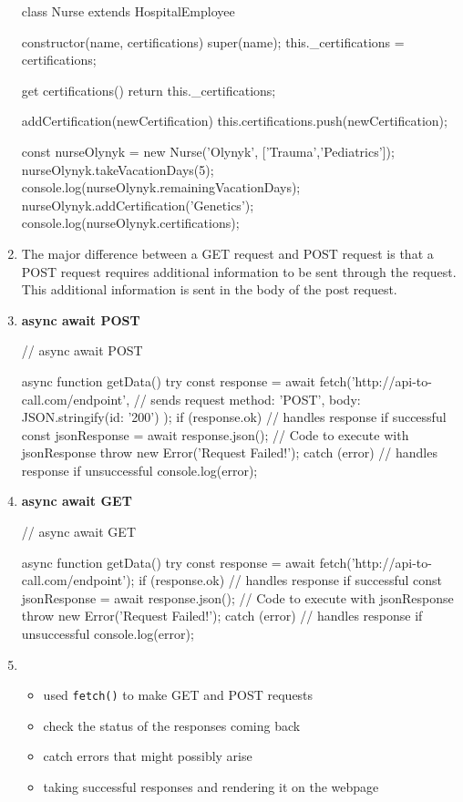 \documentclass[a4paper,12pt]{article}
\begin{document}
\begin{enumerate}
\begin{jscode}
class Nurse extends HospitalEmployee {
  constructor(name, certifications) {
    super(name);
    this._certifications = certifications;
  }  
  
  get certifications() {
    return this._certifications;
  }
  
  addCertification(newCertification) {
    this.certifications.push(newCertification);
  }
}

const nurseOlynyk = new Nurse('Olynyk', ['Trauma','Pediatrics']);
nurseOlynyk.takeVacationDays(5);
console.log(nurseOlynyk.remainingVacationDays);
nurseOlynyk.addCertification('Genetics');
console.log(nurseOlynyk.certifications);
\end{jscode}

\item The major difference between a GET request and POST request is that a POST request requires additional information to be sent through the request. This additional information is sent in the body of the post request.

\item \textbf{async await POST}
\begin{jscode}
// async await POST

async function getData(){
  try {
    const response = await fetch('http://api-to-call.com/endpoint', { // sends request
      method: 'POST',
      body: JSON.stringify({id: '200'})
    });
    if (response.ok){ // handles response if successful
      const jsonResponse = await response.json();
      // Code to execute with jsonResponse
    }
    throw new Error('Request Failed!');
  } catch (error){ // handles response if unsuccessful
    console.log(error);
  }
}
\end{jscode}

\item \textbf{async await GET}
\begin{jscode}
// async await GET

async function getData(){
  try {
    const response = await fetch('http://api-to-call.com/endpoint');
    if (response.ok){ // handles response if successful
      const jsonResponse = await response.json();
      // Code to execute with jsonResponse
    }
    throw new Error('Request Failed!');
  } catch (error) { // handles response if unsuccessful
    console.log(error);
  }
}
\end{jscode}

\item 
\begin{itemize}
\item used \verb|fetch()| to make GET and POST requests
\item check the status of the responses coming back
\item catch errors that might possibly arise
\item taking successful responses and rendering it on the webpage
\end{itemize}


\end{enumerate}
\end{document}

